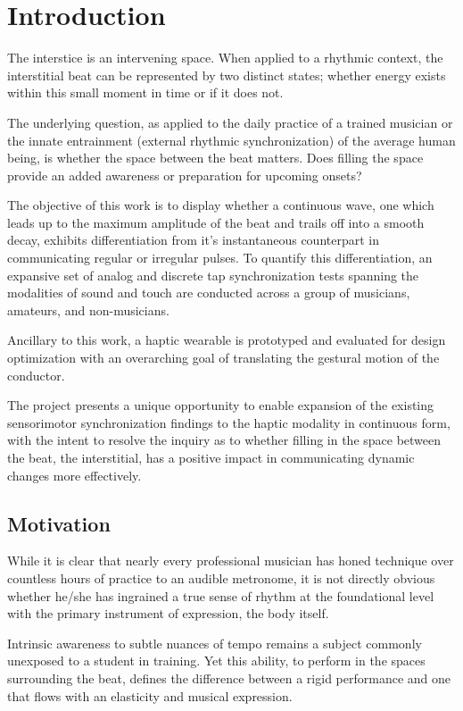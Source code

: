 
\chapter{Introduction} \label{secIntro}
The interstice is an intervening space. When applied to a rhythmic context, the interstitial beat can be represented by two distinct states; whether energy exists within this small moment in time or if it does not. 

The underlying question, as applied to the daily practice of a trained musician or the innate entrainment (external rhythmic synchronization) of the average human being, is whether the space between the beat matters. Does filling the space provide an added awareness or preparation for upcoming onsets?

The objective of this work is to display whether a continuous wave, one which leads up to the maximum amplitude of the beat and trails off into a smooth decay, exhibits differentiation from it's instantaneous counterpart in communicating regular or irregular pulses. To quantify this differentiation, an expansive set of analog and discrete tap synchronization tests spanning the modalities of sound and touch are conducted across a group of musicians, amateurs, and non-musicians.

Ancillary to this work, a haptic wearable is prototyped and evaluated for design optimization with an overarching goal of translating the gestural motion of the conductor.

The project presents a unique opportunity to enable expansion of the existing sensorimotor synchronization findings to the haptic modality in continuous form, with the intent to resolve the inquiry as to whether filling in the space between the beat, the interstitial, has a positive impact in communicating dynamic changes more effectively.

\section{Motivation}
While it is clear that nearly every professional musician has honed technique over countless hours of practice to an audible metronome, it is not directly obvious whether he/she has ingrained a true sense of rhythm at the foundational level with the primary instrument of expression, the body itself.

Intrinsic awareness to subtle nuances of tempo remains a subject commonly unexposed to a student in training. Yet this ability, to perform in the spaces surrounding the beat, defines the difference between a rigid performance and one that flows with an elasticity and musical expression.

